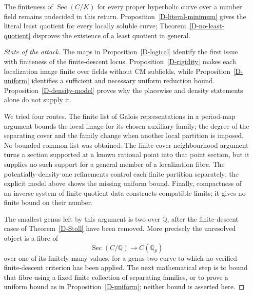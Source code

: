 \begin{proposition}
\label{D-open}
The finiteness of $\operatorname{Sec}(C/K)$
for every proper hyperbolic curve over a number
field remains undecided in this return.
Proposition~\ref{D-literal-minimum} gives the literal
least quotient for every locally soluble curve;
Theorem~\ref{D-no-least-quotient} disproves the existence
of a least quotient in general.
\end{proposition}
\begin{proof}[State of the attack]
The maps in Proposition~\ref{D-logical} identify
the first issue with finiteness of the
finite-descent locus. Proposition~\ref{D-rigidity}
makes each localization image finite over
fields without CM subfields, while
Proposition~\ref{D-uniform} identifies a
sufficient and necessary uniform reduction
bound. Proposition~\ref{D-density-model}
proves why the placewise and density
statements alone do not supply it.

We tried four routes. The finite list of
Galois representations in a period-map
argument bounds the local image for its
chosen auxiliary family; the degree of the
separating cover and the family change
when another local partition is imposed.
No bounded common list was obtained.
The finite-cover neighbourhood argument
turns a section supported at a known
rational point into that point section,
but it supplies no such support for a
general member of a localization fibre.
The potentially-density-one refinements
control each finite partition separately;
the explicit model above shows the missing
uniform bound. Finally, compactness of an
inverse system of finite quotient data
constructs compatible limits; it gives
no finite bound on their number.

The smallest genus left by this argument
is two over $\mathbb Q$, after the
finite-descent cases of Theorem~\ref{D-Stoll}
have been removed. More precisely the
unresolved object is a fibre of
\[
 \operatorname{Sec}(C/\mathbb Q)
 \longrightarrow C(\mathbb Q_p)
\]
over one of its finitely many values, for
a genus-two curve to which no verified
finite-descent criterion has been applied.
The next mathematical step is to bound
that fibre using a fixed finite collection
of separating families, or to prove a
uniform bound as in Proposition~\ref{D-uniform};
neither bound is asserted here.


\end{proof}
